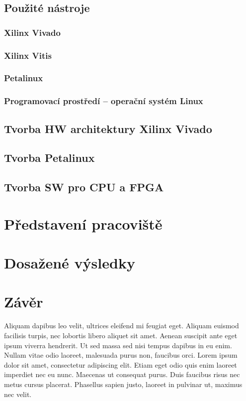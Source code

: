 \documentclass[a4paper, twoside, 11pt]{article}
\begin{document}
	\subsection{Použité nástroje}
		\subsubsection{Xilinx Vivado}
		\subsubsection{Xilinx Vitis}
		\subsubsection{Petalinux}
		\subsubsection{Programovací prostředí – operační systém Linux}
	\subsection{Tvorba HW architektury Xilinx Vivado}

	\subsection{Tvorba Petalinux}
	\subsection{Tvorba SW pro CPU a FPGA}

\section{Představení pracoviště}
\section{Dosažené výsledky}


		
\newpage
{} 
\section*{Závěr}
Aliquam dapibus leo velit, ultrices eleifend mi feugiat eget. Aliquam euismod facilisis turpis, nec lobortis libero aliquet sit amet. Aenean suscipit ante eget ipsum viverra hendrerit. Ut sed massa sed nisi tempus dapibus in eu enim. Nullam vitae odio laoreet, malesuada purus non, faucibus orci. Lorem ipsum dolor sit amet, consectetur adipiscing elit. Etiam eget odio quis enim laoreet imperdiet nec eu nunc. Maecenas ut consequat purus. Duis faucibus risus nec metus cursus placerat. Phasellus sapien justo, laoreet in pulvinar ut, maximus nec velit.\par
	
\end{document}
